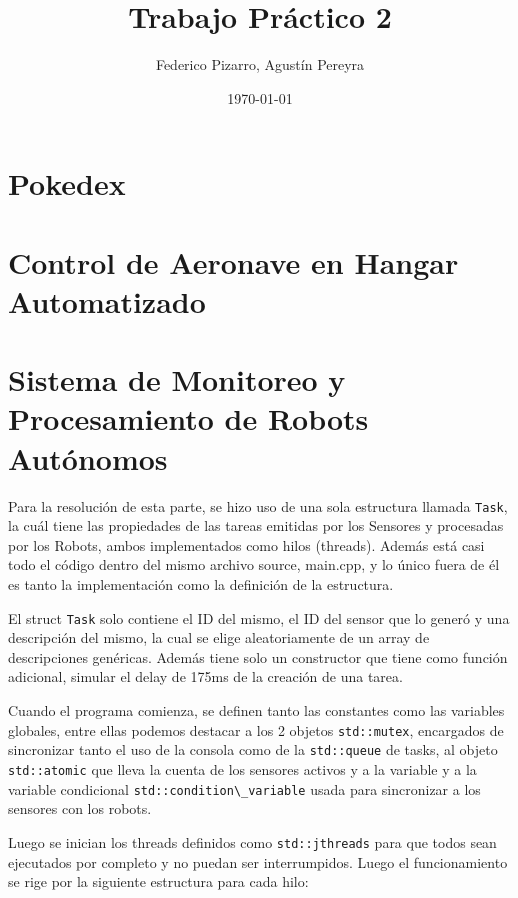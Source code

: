 \documentclass{article}
\title{Trabajo Práctico 2}
\author{Federico Pizarro, Agustín Pereyra}
\date{\today}
\begin{document}
\maketitle
\begin{multicols}{2}

\section{Pokedex}


\section{Control de Aeronave en Hangar Automatizado}


\section{Sistema de Monitoreo y Procesamiento de Robots Autónomos}
\quad Para la resolución de esta parte, se hizo uso de una sola estructura
llamada \lstinline|Task|, la cuál tiene las propiedades de las tareas
emitidas por los Sensores y procesadas por los Robots, ambos
implementados como hilos (threads). Además está casi todo el código
dentro del mismo archivo source, main.cpp, y lo único fuera de él es tanto
la implementación como la definición de la estructura.

\quad El struct \lstinline|Task| solo contiene el ID del mismo, el ID del
sensor que lo generó y una descripción del mismo, la cual se elige aleatoriamente
de un array de descripciones genéricas. Además tiene solo un constructor que tiene
como función adicional, simular el delay de 175ms de la creación de una tarea.

\quad Cuando el programa comienza, se definen tanto las constantes como las variables
globales, entre ellas podemos destacar a los 2 objetos \lstinline|std::mutex|, encargados
de sincronizar tanto el uso de la consola como de la \lstinline|std::queue| de tasks,
al objeto \lstinline|std::atomic| que lleva la cuenta de los sensores activos y a la variable
y a la variable condicional \lstinline|std::condition\_variable| usada para sincronizar a
los sensores con los robots.

Luego se inician los threads definidos como \lstinline|std::jthreads| para que todos sean
ejecutados por completo y no puedan ser interrumpidos. Luego el funcionamiento se rige por 
la siguiente estructura para cada hilo:


\end{multicols}
\end{document}
